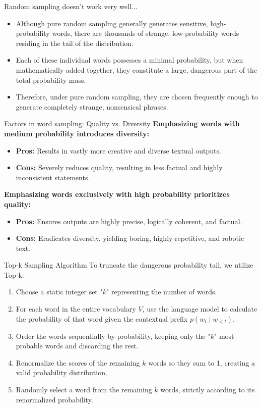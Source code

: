 \documentclass[aspectratio=169]{beamer}
\begin{document}
\begin{frame}{Random sampling doesn't work very well...}\justifying
    \begin{itemize}
        \item Although pure random sampling generally generates sensitive, high-probability words, there are thousands of strange, low-probability words residing in the tail of the distribution.
        \item Each of these individual words possesses a minimal probability, but when mathematically added together, they constitute a large, dangerous part of the total probability mass.
        \item Therefore, under pure random sampling, they are chosen frequently enough to generate completely strange, nonsensical phrases.
    \end{itemize}
\end{frame}

\begin{frame}{Factors in word sampling: Quality vs. Diversity}\justifying
    \textbf{Emphasizing words with medium probability introduces diversity:}
    \begin{itemize}
        \item \textbf{Pros:} Results in vastly more creative and diverse textual outputs.
        \item \textbf{Cons:} Severely reduces quality, resulting in less factual and highly inconsistent statements.
    \end{itemize}
    \vspace{0.5cm}
    \textbf{Emphasizing words exclusively with high probability prioritizes quality:}
    \begin{itemize}
        \item \textbf{Pros:} Ensures outputs are highly precise, logically coherent, and factual.
        \item \textbf{Cons:} Eradicates diversity, yielding boring, highly repetitive, and robotic text.
    \end{itemize}
\end{frame}

\begin{frame}{Top-k Sampling Algorithm}\justifying
    To truncate the dangerous probability tail, we utilize Top-k:
    \begin{enumerate}
        \item Choose a static integer set "$k$" representing the number of words.
        \item For each word in the entire vocabulary $V$, use the language model to calculate the probability of that word given the contextual prefix $p(w_t \mid w_{<t})$.
        \item Order the words sequentially by probability, keeping only the "$k$" most probable words and discarding the rest.
        \item Renormalize the scores of the remaining $k$ words so they sum to 1, creating a valid probability distribution.
        \item Randomly select a word from the remaining $k$ words, strictly according to its renormalized probability.
    \end{enumerate}
\end{frame}
\end{document}
